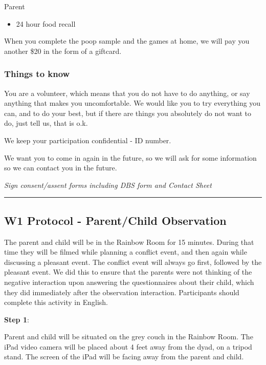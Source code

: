 \documentclass[]{book}
\providecommand{\tightlist}{%
  \setlength{\itemsep}{0pt}\setlength{\parskip}{0pt}}
\begin{document}
Parent

\begin{itemize}
\tightlist
\item
  24 hour food recall
\end{itemize}

When you complete the poop sample and the games at home, we will pay you another \$20 in the form of a giftcard.

\hypertarget{things-to-know}{%
\subsubsection{Things to know}\label{things-to-know}}

You are a volunteer, which means that you do not have to do anything, or say anything that makes you uncomfortable. We would like you to try everything you can, and to do your best, but if there are things you absolutely do not want to do, just tell us, that is o.k.

We keep your participation confidential - ID number.

We want you to come in again in the future, so we will ask for some information so we can contact you in the future.

\emph{Sign consent/assent forms including DBS form and Contact Sheet}

\begin{center}\rule{0.5\linewidth}{0.5pt}\end{center}

\hypertarget{w1-protocol---parentchild-observation}{%
\subsection{W1 Protocol - Parent/Child Observation}\label{w1-protocol---parentchild-observation}}

The parent and child will be in the Rainbow Room for 15 minutes. During that time they will be filmed while planning a conflict event, and then again while discussing a pleasant event. The conflict event will always go first, followed by the pleasant event. We did this to ensure that the parents were not thinking of the negative interaction upon answering the questionnaires about their child, which they did immediately after the observation interaction. Participants should complete this activity in English.

\textbf{Step 1}:

Parent and child will be situated on the grey couch in the Rainbow Room. The iPad video camera will be placed about 4 feet away from the dyad, on a tripod stand. The screen of the iPad will be facing away from the parent and child.
\end{document}
